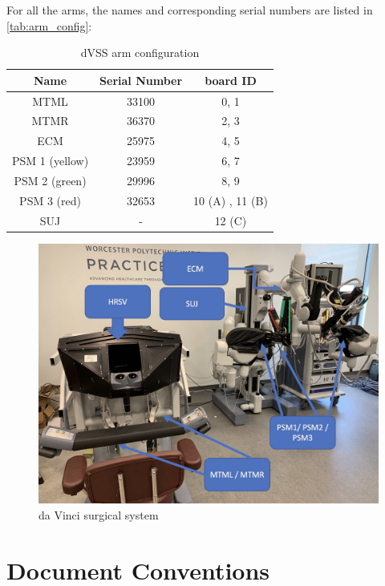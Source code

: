 For all the arms, the names and corresponding serial numbers are listed in \autoref{tab:arm_config}:

\begin{table}[H]
    \centering
    \begin{tabular}{|c|c|c|}
    \hline
    Name & Serial Number & board ID \\
    \hline
    MTML & 33100 & 0, 1 \\
    \hline
    MTMR & 36370 & 2, 3 \\
    \hline
    ECM & 25975 & 4, 5 \\
    \hline
    PSM 1 (yellow) & 23959 & 6, 7 \\
    \hline
    PSM 2 (green) & 29996 & 8, 9 \\
    \hline
    PSM 3 (red) & 32653 & 10 (A) , 11 (B) \\
    \hline
    SUJ & - & 12 (C) \\
    \hline
    \end{tabular}
    \caption{dVSS arm configuration}
    \label{tab:arm_config}
\end{table}

\begin{figure}[H]
    \centering 
    \includegraphics[width=0.95\linewidth]{figures/dVSS_intro.jpg}
    \caption{da Vinci surgical system}
    \label{fig:dVSS}
\end{figure}

\section{Document Conventions}

